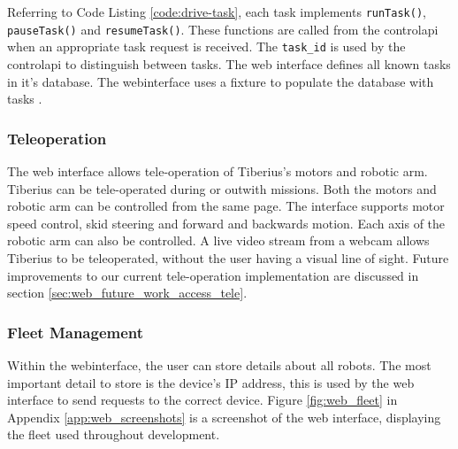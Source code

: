 \newline
Referring to Code Listing \ref{code:drive-task}, each task implements \texttt{runTask()}, \texttt{pauseTask()} and \texttt{resumeTask()}. These functions are called from the \gls{controlapi} when an appropriate task request is received. The \texttt{task\_id} is used by the \gls{controlapi} to distinguish between tasks. The web interface defines all known tasks in it's database. The \gls{webinterface} uses a fixture to populate the database with tasks \cite{github-fixtures}.


\subsubsection{Teleoperation}

The web interface allows tele-operation of Tiberius's motors and robotic arm. Tiberius can be tele-operated during or outwith missions. Both the motors and robotic arm can be controlled from the same page. The interface supports motor speed control, skid steering and forward and backwards motion. Each axis of the robotic arm can also be controlled. A live video stream from a webcam allows Tiberius to be teleoperated, without the user having a visual line of sight.
\newline
Future improvements to our current tele-operation implementation are discussed in section \ref{sec:web_future_work_access_tele}.


\subsubsection{Fleet Management}
Within the \gls{webinterface}, the user can store details about all robots. The most important detail to store is the device's IP address, this is used by the web interface to send requests to the correct device. Figure \ref{fig:web_fleet} in Appendix \ref{app:web_screenshots} is a screenshot of the web interface, displaying the fleet used throughout development.